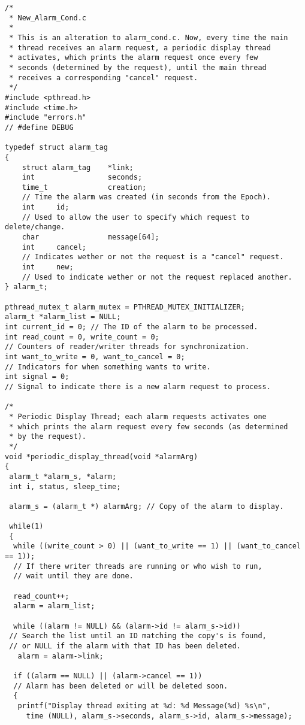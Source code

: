 \documentclass[11pt]{article}
\begin{document}
\begin{lstlisting} 
/*
 * New_Alarm_Cond.c
 *
 * This is an alteration to alarm_cond.c. Now, every time the main
 * thread receives an alarm request, a periodic display thread
 * activates, which prints the alarm request once every few
 * seconds (determined by the request), until the main thread
 * receives a corresponding "cancel" request. 
 */
#include <pthread.h>
#include <time.h>
#include "errors.h"
// #define DEBUG

typedef struct alarm_tag
{
    struct alarm_tag    *link;
    int                 seconds;
    time_t              creation;   
    // Time the alarm was created (in seconds from the Epoch).
    int     id; 
    // Used to allow the user to specify which request to delete/change.
    char                message[64];
    int     cancel; 
    // Indicates wether or not the request is a "cancel" request.
    int     new; 
    // Used to indicate wether or not the request replaced another.
} alarm_t;

pthread_mutex_t alarm_mutex = PTHREAD_MUTEX_INITIALIZER;
alarm_t *alarm_list = NULL;
int current_id = 0; // The ID of the alarm to be processed.
int read_count = 0, write_count = 0; 
// Counters of reader/writer threads for synchronization.
int want_to_write = 0, want_to_cancel = 0; 
// Indicators for when something wants to write.
int signal = 0; 
// Signal to indicate there is a new alarm request to process.

/*
 * Periodic Display Thread; each alarm requests activates one
 * which prints the alarm request every few seconds (as determined
 * by the request).
 */
void *periodic_display_thread(void *alarmArg)
{
 alarm_t *alarm_s, *alarm;
 int i, status, sleep_time;
 
 alarm_s = (alarm_t *) alarmArg; // Copy of the alarm to display.
 
 while(1)
 { 
  while ((write_count > 0) || (want_to_write == 1) || (want_to_cancel == 1));
  // If there writer threads are running or who wish to run, 
  // wait until they are done.
  
  read_count++;
  alarm = alarm_list;
  
  while ((alarm != NULL) && (alarm->id != alarm_s->id)) 
 // Search the list until an ID matching the copy's is found, 
 // or NULL if the alarm with that ID has been deleted.
   alarm = alarm->link;
  
  if ((alarm == NULL) || (alarm->cancel == 1)) 
  // Alarm has been deleted or will be deleted soon.
  { 
   printf("Display thread exiting at %d: %d Message(%d) %s\n",
     time (NULL), alarm_s->seconds, alarm_s->id, alarm_s->message);
   

\end{lstlisting}
\end{document}
